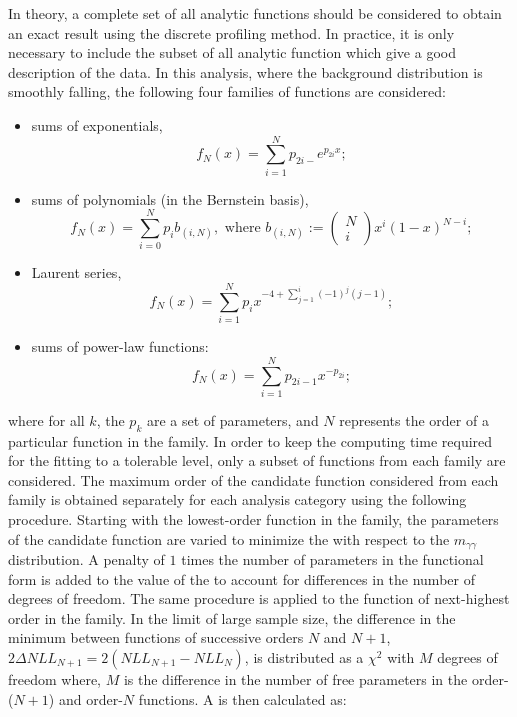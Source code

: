 In theory, a complete set of all analytic functions should be considered to obtain an exact result using the discrete profiling method. In practice, it is only necessary to include the subset of all analytic function which give a good description of the data. In this analysis, where the background distribution is smoothly falling, the following four families of functions are considered:
\begin{itemize}
\item sums of exponentials, $$ f_{N}(x)= \sum^{N}_{i=1} p_{2i-} e^{p_{2i} x} ;$$
\item sums of polynomials (in the Bernstein basis), $$ f_{N}(x) = \sum^{N}_{i=0} p_{i} b_{(i,N)}, \text{ where } b_{(i,N)}:= \begin{pmatrix} N \\ i \end{pmatrix} x^i (1-x)^{N-i} ;$$
\item Laurent series, $$ f_{N}(x)= \sum^{N}_{i=1} p_{i} x^{-4 + \sum^{i}_{j=1} (-1)^{j} (j-1)};$$
\item sums of power-law functions: $$ f_{N}(x)= \sum^{N}_{i=1} p_{2i-1} x^{-p_{2i}};$$
\end{itemize}
where for all $k$, the $p_k$ are a set of parameters, and $N$ represents the order of a particular function in the family. 
In order to keep the computing time required for the fitting to a tolerable level, only a subset of functions from each family are considered. The maximum order of the candidate function considered from each family is obtained separately for each analysis category using the following procedure. Starting with the lowest-order function in the family, the parameters of the candidate function are varied to minimize the \NLL with respect to the $m_{\gamma\gamma}$ distribution. A penalty of $1$ times the number of parameters in the functional form is added to the value of the \NLL to account for differences in the number of degrees of freedom. The same procedure is applied to the function of next-highest order in the family. 
In the limit of large sample size, the difference in the minimum \NLL between functions of successive orders $N$ and $N+1$, $2 \Delta NLL_{N+1} = 2(NLL_{N+1} - NLL_{N})$, is distributed as a $\chi^2$ with $M$ degrees of freedom where, $M$ is the difference in the number of free parameters in the order-($N+1$) and order-$N$ functions. A \pvalue is then calculated as:

